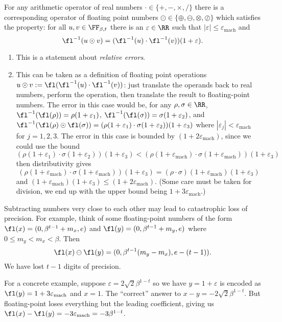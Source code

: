 \begin{fundamentalAxiomFloat}
For any arithmetic operator of real numbers $\cdot\in\{+,-,\times,/\}$ there
is a corresponding operator of floating point numbers $\odot\in\{\oplus,\ominus,\otimes,\oslash\}$
which satisfies the property: for all $u,v\in\FF_{\beta,t}$ there is an
$\varepsilon\in\RR$ such that $|\varepsilon|\leq\varepsilon_{\text{mach}}$ and
\begin{equation}
  \fl^{-1}(u\odot v) = (\fl^{-1}(u)\cdot\fl^{-1}(v))(1 + \varepsilon).
\end{equation}
\end{fundamentalAxiomFloat}
\begin{rmk}
  \begin{enumerate}
  \item This is a statement about \emph{relative errors}.
  \item This can be taken as a definition of floating point operations
    $u\odot v := \fl(\fl^{-1}(u)\cdot\fl^{-1}(v))$: just translate the
    operands back to real numbers, perform the operation, then translate
    the result to floating-point numbers. The error in this case would
    be, for any $\rho,\sigma\in\RR$,
    $\fl^{-1}(\fl(\rho))=\rho(1+\varepsilon_{1})$,
    $\fl^{-1}(\fl(\sigma))=\sigma(1+\varepsilon_{2})$, and $\fl^{-1}(\fl(\rho)\odot\fl(\sigma))=(\rho(1+\varepsilon_{1})\cdot\sigma(1+\varepsilon_{2}))(1+\varepsilon_{3})$
    where $|\varepsilon_{j}|<\varepsilon_{\text{mach}}$ for
    $j=1,2,3$. The error in this case is bounded by $(1 + 2\varepsilon_{\text{mach}})$,
    since we could use the bound
    $$(\rho(1+\varepsilon_{1})\cdot\sigma(1+\varepsilon_{2}))(1+\varepsilon_{3})<(\rho(1+\varepsilon_{\text{mach}})\cdot\sigma(1+\varepsilon_{\text{mach}}))(1+\varepsilon_{3})$$
    then distributivity gives $$(\rho(1+\varepsilon_{\text{mach}})\cdot\sigma(1+\varepsilon_{\text{mach}}))(1+\varepsilon_{3})=(\rho\cdot\sigma)(1+\varepsilon_{\text{mach}})(1+\varepsilon_{3})$$
    and $(1+\varepsilon_{\text{mach}})(1+\varepsilon_{3})\leq(1 + 2\varepsilon_{\text{mach}})$.
    (Some care must be taken for division, we end up with the upper
    bound being $1+3\varepsilon_{\text{mach}}$.)
  \end{enumerate}
\end{rmk}
\begin{note}
Subtracting numbers very close to each other may lead to catastrophic
loss of precision. For example, think of some floating-point numbers of
the form $\fl(x)=(0,\beta^{t-1}+m_x,e)$ and $\fl(y)=(0,\beta^{t-1}+m_{y},e)$ where $0\leq m_{y}<m_{x}<\beta$.
Then
\begin{equation}
  \fl(x)\ominus\fl(y) = (0,\beta^{t-1}(m_{y}-m_{x}),e-(t-1)).
\end{equation}
We have lost $t-1$ digits of precision.

For a concrete example, suppose $\varepsilon=2\sqrt{2}\beta^{1-t}$ so we
have $y=1+\varepsilon$ is encoded as
$\fl(y)=1+3\varepsilon_{\text{mach}}$ and $x=1$. The ``correct'' answer
to $x-y=-2\sqrt{2}\beta^{1-t}$. But floating-point loses
everything but the leading coefficient, giving us
$\fl(x)-\fl(y)=-3\varepsilon_{\text{mach}} = -3\beta^{1-t}$.
\end{note}

